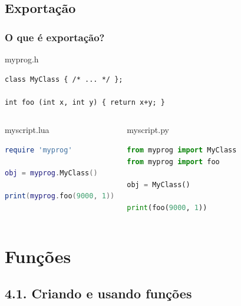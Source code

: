 \documentclass[brazil]{beamer}
\begin{document}
\subsection{Exportação}
\begin{frame}[fragile]
  \frametitle{O que é exportação?}
  \pause
  \begin{block}{myprog.h}
    \begin{lstlisting}
class MyClass { /* ... */ };

int foo (int x, int y) { return x+y; }
    \end{lstlisting}
  \end{block}
  \pause
  \begin{columns}
      \begin{block}{myscript.lua}
        \begin{lstlisting}[language=lua]
require 'myprog'

obj = myprog.MyClass()

print(myprog.foo(9000, 1))
        \end{lstlisting}
      \end{block}
    \pause
      \begin{block}{myscript.py}
        \begin{lstlisting}[language=python]
from myprog import MyClass
from myprog import foo

obj = MyClass()

print(foo(9000, 1))
        \end{lstlisting}
      \end{block}
  \end{columns}
\end{frame}
\section{Funções}
\subsection{4.1. Criando e usando funções}
\end{document}
